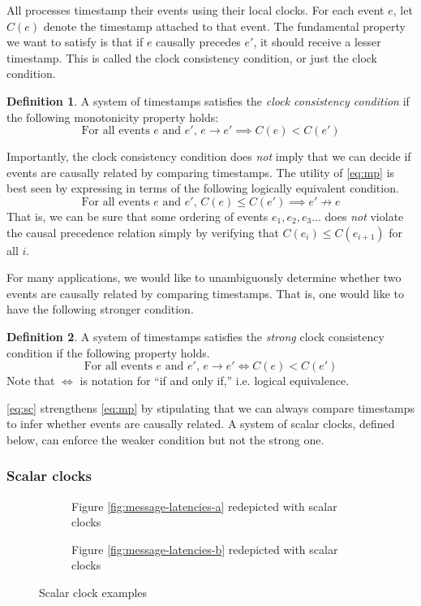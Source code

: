 \documentclass[]             %
{NASA}                       %
\theoremstyle{definition}
\newtheorem{definition}{Definition}[section]
\begin{document}
All processes timestamp their events using their local clocks. For
each event $e$, let $C(e)$ denote the timestamp attached to that
event. The fundamental property we want to satisfy is that if $e$
causally precedes $e'$, it should receive a lesser timestamp. This is
called the clock consistency condition, or just the clock condition.
\begin{definition}
  A system of timestamps satisfies the \emph{clock consistency
  condition} if the following monotonicity property holds:
  \[ \textrm{For all events $e$ and $e'$, } e \to e' \implies C(e) < C(e') \label{eq:mp}\tag{CC} \]
\end{definition}

Importantly, the clock consistency condition does \emph{not} imply
that we can decide if events are causally related by comparing
timestamps. The utility of \eqref{eq:mp} is best seen by expressing in
terms of the following logically equivalent condition.
\[ \textrm{For all events $e$ and $e'$, }C(e) \leq C(e') \implies e'
  \not\to e \label{eq:mp-conv} \] That is, we can be sure that some
ordering of events $e_1, e_2, e_3\ldots$ does \emph{not} violate the
causal precedence relation simply by verifying that
$C(e_{i}) \leq C(e_{i+1})$ for all $i$.

For many applications, we would like to unambiguously determine
whether two events are causally related by comparing timestamps. That
is, one would like to have the following stronger condition.
\begin{definition}
  A system of timestamps satisfies the \emph{strong} clock consistency
  condition if the following property holds.
  \[ \textrm{For all events $e$ and $e'$, } e \to e' \iff C(e) < C(e') \label{eq:sc}\tag{SC} \]
  Note that $\iff$ is notation for ``if and only if,'' i.e. logical equivalence.
\end{definition}
\ref{eq:sc} strengthens \ref{eq:mp} by stipulating that we can always
compare timestamps to infer whether events are causally related. A
system of scalar clocks, defined below, can enforce the weaker
condition but not the strong one.

\subsubsection{Scalar clocks}
\begin{figure}
  \setlength\belowcaptionskip{5ex}

  \begin{subfigure}{1\textwidth}
    \centering 
    \caption{Figure \ref{fig:message-latencies-a} redepicted with scalar clocks}
    \label{fig:message-latencies-scalar-a}
  \end{subfigure}

  \begin{subfigure}{1\textwidth}
    \centering 
    \caption{Figure \ref{fig:message-latencies-b} redepicted with scalar clocks}
    \label{fig:message-latencies-scalar-b}
  \end{subfigure}

  \caption{Scalar clock examples}
  \label{fig:message-latencies-scalar}
\end{figure}
\end{document}
